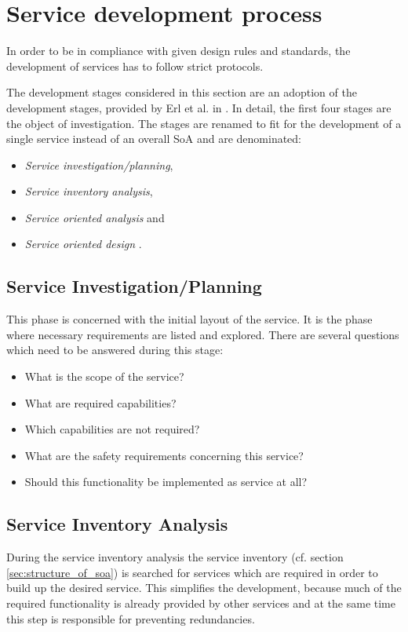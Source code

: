 \section{Service development process}
\label{sec:service-development-process}
In order to be in compliance with given design rules and standards, the development of services has to follow strict protocols.

The development stages considered in this section are an adoption of the development stages, provided by Erl et al. in \cite[p.116]{erl2011}. In detail, the first four stages are the object of investigation. The stages are renamed to fit for the development of a single service instead of an overall SoA and are denominated:
\begin{itemize}
\item \emph{Service investigation/planning},
\item \emph{Service inventory analysis},
\item \emph{Service oriented analysis} and
\item \emph{Service oriented design} \cite[p.116]{erl2011}.
\end{itemize}


\subsection{Service Investigation/Planning}
This phase is concerned with the initial layout of the service. It is the phase where necessary requirements are listed and explored. There are several questions which need to be answered during this stage:
\begin{itemize}
\item What is the scope of the service?
\item What are required capabilities?
\item Which capabilities are not required?
\item What are the safety requirements concerning this service?
\item Should this functionality be implemented as service at all?
\end{itemize}



\subsection{Service Inventory Analysis}

During the service inventory analysis the service inventory (cf. section \ref{sec:structure_of_soa}) is searched for services which are required in order to build up the desired service. This simplifies the development, because much of the required functionality is already provided by other services and at the same time this step is responsible for preventing redundancies.

